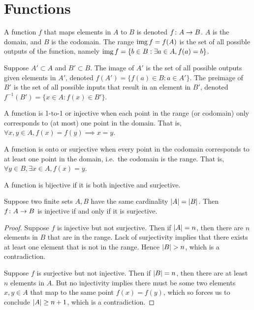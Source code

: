 \section{Functions}

\begin{definition}
    A function \(f\) that maps elements in \(A\) to \(B\)
    is denoted \(f\colon A\to B\).
    \(A\) is the domain, and \(B\) is the codomain.
    The range \(\operatorname{img} f= f(A)\) is the set of all possible outputs of the function,
    namely \(\operatorname{img} f = \{b \in B : \exists a \in A, f(a) = b\}\).
\end{definition}

\begin{definition}
    Suppose \(A' \subset A\) and \(B' \subset B\).
    The image of \(A'\) is the set of all possible outputs
    given elements in \(A'\),
    denoted \(f(A') = \{f(a) \in B : a \in A'\}\).
    The preimage of \(B'\) is the set of all possible inputs
    that result in an element in \(B'\),
    denoted \(f^{-1}(B') = \{x \in A : f(x) \in B'\}\).
\end{definition}

\begin{definition}
    A function is 1-to-1 or injective
    when each point in the range (or codomain)
    only corresponds to (at most) one point in the domain.
    That is, \(\forall x,y \in A, f(x) = f(y) \implies x = y\).
\end{definition}
\begin{definition}
    A function is onto or surjective
    when every point in the codomain
    corresponds to at least one point in the domain,
    i.e.\ the codomain is the range.
    That is, \(\forall y \in B, \exists x \in A, f(x) = y\).
\end{definition}
\begin{definition}
    A function is bijective if it is both injective and surjective.
\end{definition}


\begin{theorem}\label{thm:pigeonhole}
    Suppose two finite sets \(A,B\) have the same cardinality
    \(\abs{A} = \abs{B}\).
    Then \(f\colon A\to B\) is injective
    if and only if it is surjective.
\end{theorem}
\begin{proof}
    Suppose \(f\) is injective but not surjective.
    Then if \(\abs{A} = n\),
    then there are \(n\) elements in \(B\) that are in the range.
    Lack of surjectivity implies that
    there exists at least one element that is not in the range.
    Hence \(\abs{B} > n\), which is a contradiction.

    Suppose \(f\) is surjective but not injective.
    Then if \(\abs{B} = n\),
    then there are at least \(n\) elements in \(A\).
    But no injectivity implies there must be some two elements
    \(x,y \in A\) that map to the same point \(f(x) = f(y)\),
    which so forces us to conclude \(\abs{A} \geq n+1\),
    which is a contradiction.
\end{proof}

